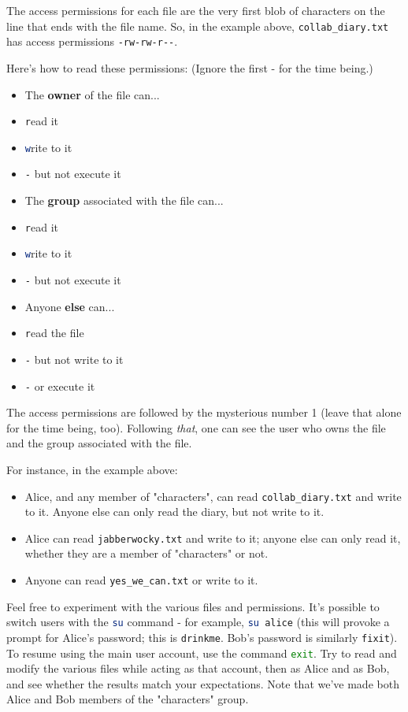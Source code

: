 \documentclass{article}
\newcommand{\xcode}[2]{\colorbox{ubuntuback}{\lstinline[language=#1]|#2|}}
\newcommand{\code}[1]{\colorbox{ubuntuback}{\texttt{#1}}}
\begin{document}
The access permissions for each file are the very first blob of characters on the line that ends with the file name. So, in the example above, \code{collab\_diary.txt} has access permissions \xcode{bash}{-rw-rw-r--}.

Here's how to read these permissions:
(Ignore the first - for the time being.)
\begin{itemize}
    \item The \textbf{owner} of the file can...
    \item \xcode{bash}{r}ead it
    \item \xcode{bash}{w}rite to it
    \item \xcode{bash}{-} but not execute it
    \item The \textbf{group} associated with the file can...
    \item \xcode{bash}{r}ead it
    \item \xcode{bash}{w}rite to it
    \item \xcode{bash}{-} but not execute it
    \item Anyone \textbf{else} can...
    \item \xcode{bash}{r}ead the file
    \item \xcode{bash}{-} but not write to it
    \item \xcode{bash}{-} or execute it
\end{itemize}

The access permissions are followed by the mysterious number 1 (leave that alone for the time being, too). Following \textit{that}, one can see the user who owns the file and the group associated with the file.

For instance, in the example above:
\begin{itemize}
    \item Alice, and any member of "characters", can read \code{collab\_diary.txt} and write to it. Anyone else can only read the diary, but not write to it.
    \item Alice can read \code{jabberwocky.txt} and write to it; anyone else can only read it, whether they are a member of "characters" or not.
    \item Anyone can read \code{yes\_we\_can.txt} or write to it.
\end{itemize}

Feel free to experiment with the various files and permissions. It's possible to switch users with the \xcode{bash}{su} command - for example, \xcode{bash}{su alice} (this will provoke a prompt for Alice's password; this is \code{drinkme}. Bob's password is similarly \code{fixit}). To resume using the main user account, use the command \xcode{bash}{exit}. Try to read and modify the various files while acting as that account, then as Alice and as Bob, and see whether the results match your expectations. Note that we've made both Alice and Bob members of the "characters" group.
\end{document}
